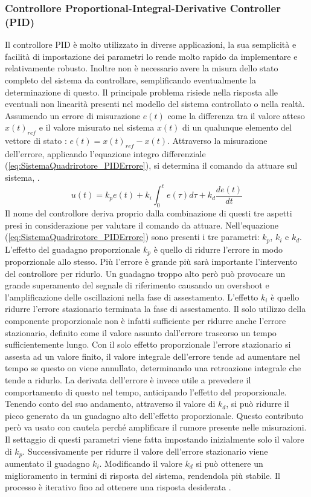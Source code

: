 \subsubsection{Controllore Proportional-Integral-Derivative Controller (PID)}
Il controllore PID è molto utilizzato in diverse applicazioni, la sua semplicità e facilità di impostazione dei parametri lo rende molto rapido da implementare e relativamente robusto. Inoltre non è necessario avere la misura dello stato completo del sistema da controllare, semplificando eventualmente la determinazione di questo. Il principale problema risiede nella risposta alle eventuali non linearità presenti nel modello del sistema controllato o nella realtà.
Assumendo un errore di misurazione $e(t)$ come la differenza tra il valore atteso $x(t)_{ref}$ e il valore misurato nel sistema $x(t)$ di un qualunque elemento del vettore di stato : $e(t)=x(t)_{ref}-x(t)$. Attraverso la misurazione dell'errore, applicando l'equazione integro differenziale (\ref{eq:SistemaQuadrirotore_PIDErrore}), si determina il comando da attuare sul sistema, \cite{advanced-pid-control}.
\begin{equation}\label{eq:SistemaQuadrirotore_PIDErrore}
	u(t) = k_p e(t) + k_i \int_0^t e(\tau) d\tau + k_d \frac{d e(t)}{d t}
\end{equation}
Il nome del controllore deriva proprio dalla combinazione di questi tre aspetti presi in considerazione per valutare il comando da attuare.
Nell'equazione (\ref{eq:SistemaQuadrirotore_PIDErrore}) sono presenti i tre parametri: $k_p$, $k_i$ e $k_d$.
L'effetto del guadagno proporzionale $k_p$ è quello di ridurre l'errore in modo proporzionale allo stesso. Più l'errore è grande più sarà importante l'intervento del controllore per ridurlo. Un guadagno troppo alto però può provocare un grande superamento del segnale di riferimento causando un overshoot e l'amplificazione delle oscillazioni nella fase di assestamento.
L'effetto $k_i$ è quello ridurre l'errore stazionario terminata la fase di assestamento. Il solo utilizzo della componente proporzionale non è infatti sufficiente per ridurre anche l'errore stazionario, definito come il valore assunto dall'errore trascorso un tempo sufficientemente lungo. Con il solo effetto proporzionale l'errore stazionario si assesta ad un valore finito, il valore integrale dell'errore tende ad aumentare nel tempo se questo on viene annullato, determinando una retroazione integrale che tende a ridurlo.
La derivata dell'errore è invece utile a prevedere il comportamento di questo nel tempo, anticipando l'effetto del proporzionale. Tenendo conto del suo andamento, attraverso il valore di $k_d$, si può ridurre il picco generato da un guadagno alto dell'effetto proporzionale. Questo contributo però va usato con cautela perché amplificare il rumore presente nelle misurazioni.
Il settaggio di questi parametri viene fatta impostando inizialmente solo il valore di $k_p$. Successivamente per ridurre il valore dell'errore stazionario viene aumentato il guadagno $k_i$. Modificando il valore $k_d$ si può ottenere un miglioramento in termini di risposta del sistema, rendendola più stabile. Il processo è iterativo fino ad ottenere una risposta desiderata \cite{advanced-pid-control}.


